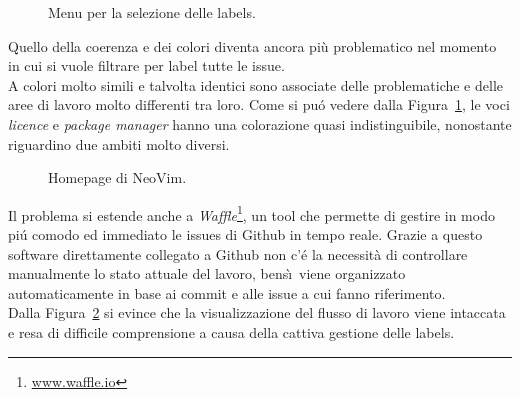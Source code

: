\documentclass[12pt]{article} %
\begin{document}
\begin{figure}[H]
\caption{Menu per la selezione delle labels.}
\label{fig:cattivoesempio2}
\end{figure}

Quello della coerenza e dei colori diventa ancora pi\`u problematico nel momento in cui si vuole filtrare per label tutte le issue.\\
A colori molto simili e talvolta identici sono associate delle problematiche e delle aree di lavoro molto differenti tra loro. Come si pu\'o vedere dalla Figura~\ref{fig:cattivoesempio2}, le voci \emph{licence} e \emph{package manager} hanno una colorazione quasi indistinguibile, nonostante riguardino due ambiti molto diversi.

\begin{figure}[H]
\caption{Homepage di NeoVim.}
\label{fig:cattivoesempio3}
\end{figure}

Il problema si estende anche a \emph{Waffle}\footnote{\url{www.waffle.io}}, un tool che permette di gestire in modo pi\'u comodo ed immediato le issues di Github in tempo reale. Grazie a questo software direttamente collegato a Github non c'\'e la necessit\`a di controllare manualmente lo stato attuale del lavoro, bens\`\i\ viene organizzato automaticamente in base ai commit e alle issue a cui fanno riferimento.\\
Dalla Figura~\ref{fig:cattivoesempio3} si evince che la visualizzazione del flusso di lavoro viene intaccata e resa di difficile comprensione a causa della cattiva gestione delle labels.
\end{document}
